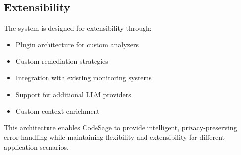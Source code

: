 \subsection{Extensibility}
The system is designed for extensibility through:

\begin{itemize}
    \item Plugin architecture for custom analyzers
    \item Custom remediation strategies
    \item Integration with existing monitoring systems
    \item Support for additional LLM providers
    \item Custom context enrichment
\end{itemize}

This architecture enables CodeSage to provide intelligent, privacy-preserving error handling while maintaining flexibility and extensibility for different application scenarios. 